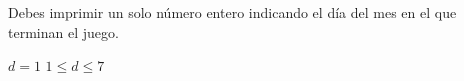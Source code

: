 \documentclass{oci}
\begin{document}
\begin{outputDescription}
  Debes imprimir un solo número entero indicando el día del mes en el que terminan el juego.
\end{outputDescription}

\begin{scoreDescription}
  $d = 1$
  $1 \leq d \leq 7$
\end{scoreDescription}

\begin{sampleDescription}
\end{sampleDescription}
\end{document}
